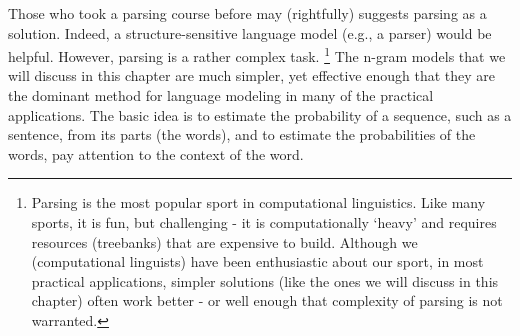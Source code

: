 Those who took a parsing course before may (rightfully)
suggests parsing as a solution.
Indeed,
a structure-sensitive language model (e.g., a parser) would be helpful.
However,
parsing is a rather complex task.%
\footnote{Parsing is the most popular sport in computational linguistics.
  Like many sports, it is fun, but challenging -
  it is computationally `heavy' and requires resources (treebanks)
  that are expensive to build.
  Although we (computational linguists) have been enthusiastic about our sport,
  in most practical applications,
  simpler solutions (like the ones we will discuss in this chapter)
  often work better -
  or well enough that complexity of parsing is not warranted.
}
The n-gram models that we will discuss in this chapter are much simpler,
yet effective enough that they are the dominant method for language modeling
in many of the practical applications.
The basic idea is to estimate the probability of a sequence,
such as a sentence,
from its parts (the words),
and to estimate the probabilities of the words,
pay attention to the context of the word.


